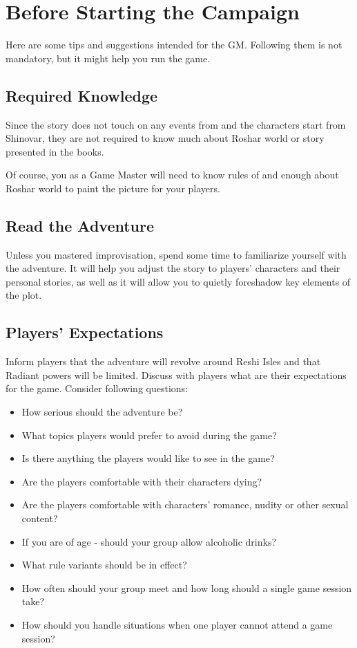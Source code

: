 \section{Before Starting the Campaign}

Here are some tips and suggestions intended for the GM. Following them is not mandatory, but it might help you run the game.

\subsection{Required Knowledge}

Since the story does not touch on any events from \bookSA{} and the characters start from Shinovar, they are not required to know much about Roshar world or story presented in the books.

Of course, you as a Game Master will need to know rules of \cosmereRPG{} and enough about Roshar world to paint the picture for your players.

\subsection{Read the Adventure}

Unless you mastered improvisation, spend some time to familiarize yourself with the adventure. It will help you adjust the story to players' characters and their personal stories, as well as it will allow you to quietly foreshadow key elements of the plot.

\subsection{Players’ Expectations}

Inform players that the adventure will revolve around Reshi Isles and that Radiant powers will be limited. Discuss with players what are their expectations for the game. Consider following questions:
\begin{itemize}
	\item How serious should the adventure be?
	\item What topics players would prefer to avoid during the game?
	\item Is there anything the players would like to see in the game?
	\item Are the players comfortable with their characters dying?
	\item Are the players comfortable with characters' romance, nudity or other sexual content?
	\item If you are of age - should your group allow alcoholic drinks?
	\item What rule variants should be in effect?
	\item How often should your group meet and how long should a single game session take?
	\item How should you handle situations when one player cannot attend a game session?
\end{itemize}

